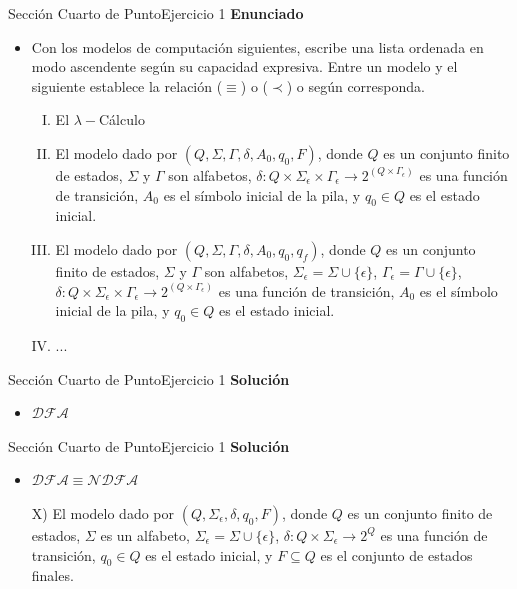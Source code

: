 \documentclass[10pt, envcountsect, presentation, aspectratio=169]{beamer}
\begin{document}
\begin{frame}{Sección Cuarto de Punto}{Ejercicio 1}
    \textbf{Enunciado}
    \begin{itemize}
        \item Con los modelos de computación  siguientes,  escribe una lista  ordenada en modo ascendente según su capacidad expresiva. Entre un modelo y el siguiente establece  la relación  ($\equiv$) o ($\prec$) o  según corresponda.
		\begin{enumerate}[I)]
            \item El $\lambda-$Cálculo
            \item El modelo dado por $(Q,\Sigma,\Gamma,\delta,A_0,q_0,F)$, donde  $Q$ es un conjunto finito de estados, $\Sigma$ y $\Gamma$ son alfabetos, $\delta:Q\times \Sigma_\epsilon\times\Gamma_\epsilon\rightarrow 2^{(Q\times\Gamma_\epsilon)}$ es  una función de transición, $A_0$ es el símbolo inicial de la pila, y $q_0\in Q$ es el estado inicial. 
            \item El modelo dado por $(Q,\Sigma,\Gamma,\delta,A_0,q_0,q_f)$, donde  $Q$ es un conjunto finito de estados, $\Sigma$ y $\Gamma$ son alfabetos, $\Sigma_\epsilon=\Sigma \cup \{\epsilon\}$, $\Gamma_\epsilon=\Gamma \cup \{\epsilon\}$, $\delta:Q\times \Sigma_\epsilon\times\Gamma_\epsilon\rightarrow 2^{(Q\times\Gamma_\epsilon)}$ es  una  función de transición, $A_0$ es el símbolo inicial de la pila, y $q_0\in Q$ es el estado inicial. 
            \item ...
        \end{enumerate}
	\end{itemize}
\end{frame}


\begin{frame}{Sección Cuarto de Punto}{Ejercicio 1}
    \textbf{Solución}\\
    \begin{itemize}
        \item $\mathcal{DFA}$
    \end{itemize}
\end{frame}


\begin{frame}{Sección Cuarto de Punto}{Ejercicio 1}
    \textbf{Solución}\\
    \begin{itemize}
        \item $\mathcal{DFA} \equiv \mathcal{NDFA}$
        \item[X)] El modelo dado por  $(Q,\Sigma_\epsilon,\delta,q_0,F)$, donde  $Q$ es un   conjunto finito de estados, $\Sigma$ es un alfabeto, $\Sigma_\epsilon=\Sigma \cup \{\epsilon\}$, $\delta:Q\times \Sigma_\epsilon\rightarrow 2^{Q}$ es una función de transición, $q_0\in Q$ es el  estado inicial, y $F\subseteq Q$ es el conjunto de estados finales.
    \end{itemize}
\end{frame}
\end{document}
